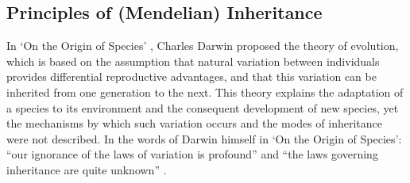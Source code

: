 \subsection{Principles of (Mendelian) Inheritance} %
\label{sec:Mendel}

In `On the Origin of Species' \cite{darwin1859origin}, Charles Darwin proposed the theory of evolution, which is based on the assumption that natural variation between individuals provides differential reproductive advantages, and that this variation can be inherited from one generation to the next. 
This theory explains the adaptation of a species to its environment and the consequent development of new species, yet the mechanisms by which such variation occurs and the modes of inheritance were not described. 
In the words of Darwin himself in `On the Origin of Species': “our ignorance of the laws of variation is profound” and “the laws governing inheritance are quite unknown” \cite{darwin1859origin}.\\

